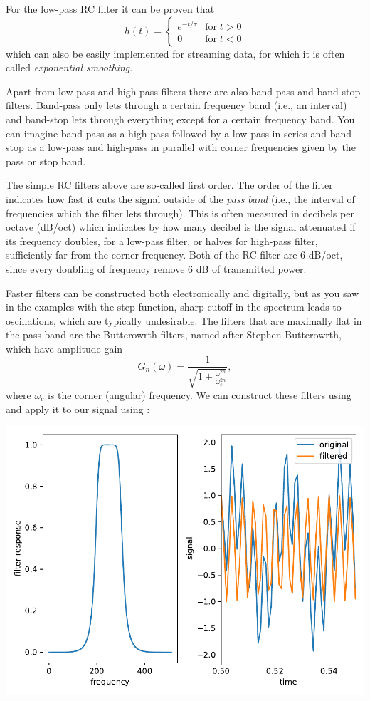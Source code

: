 For the low-pass RC filter it can be proven that
\begin{equation}
    h(t) = \left\{\begin{matrix}
        e^{-t/\tau} & \mathrm{for}\; t > 0 \\
        0 & \mathrm{for}\; t < 0
    \end{matrix}\right.
\end{equation}
which can also be easily implemented for streaming data, for which it is often called \emph{exponential smoothing}.

Apart from low-pass and high-pass filters there are also band-pass and band-stop filters. Band-pass only lets through a certain frequency band (i.e., an interval) and band-stop lets through everything except for a certain frequency band. You can imagine band-pass as a high-pass followed by a low-pass in series and band-stop as a low-pass and high-pass in parallel with corner frequencies given by the pass or stop band. 

The simple RC filters above are so-called first order. The order of the filter indicates how fast it cuts the signal outside of the \emph{pass band} (i.e., the interval of frequencies which the filter lets through). This is often measured in decibels per octave (dB/oct) which indicates by how many decibel is the signal attenuated if its frequency doubles, for a low-pass filter, or halves for high-pass filter, sufficiently far from the corner frequency. Both of the RC filter are 6 dB/oct, since every doubling of frequency remove 6 dB of transmitted power.

Faster filters can be constructed both electronically and digitally, but as you saw in the examples with the step function, sharp cutoff in the spectrum leads to oscillations, which are typically undesirable. The filters that are maximally flat in the pass-band are the Butterowrth filters, named after Stephen Butterowrth, which have amplitude gain
\begin{equation*}
    G_n(\omega) = \frac{1}{\sqrt{1 + \frac{\omega^{2n}}{\omega_c^{2n}}}},
\end{equation*}
where $\omega_c$ is the corner (angular) frequency. We can construct these filters using  and apply it to our signal using 
:
\begin{center}
    \includegraphics[width=0.5\linewidth]{butter.pdf}
\end{center}

